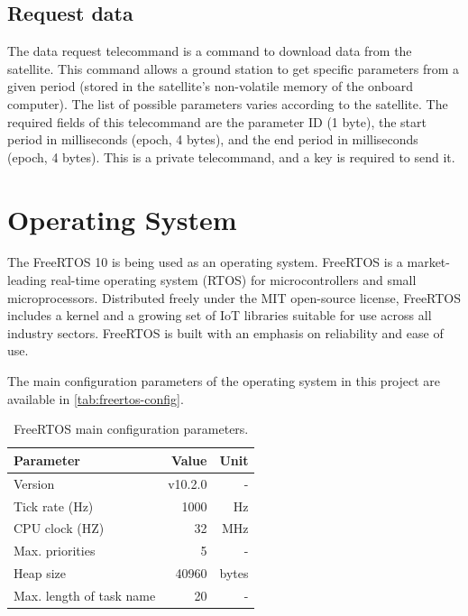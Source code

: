 \subsection{Request data}

The data request telecommand is a command to download data from the satellite. This command allows a ground station to get specific parameters from a given period (stored in the satellite's non-volatile memory of the onboard computer). The list of possible parameters varies according to the satellite. The required fields of this telecommand are the parameter ID (1 byte), the start period in milliseconds (epoch, 4 bytes), and the end period in milliseconds (epoch, 4 bytes). This is a private telecommand, and a key is required to send it.

\section{Operating System}

The FreeRTOS 10 \cite{freertos} is being used as an operating system. FreeRTOS is a market-leading real-time operating system (RTOS) for microcontrollers and small microprocessors. Distributed freely under the MIT open-source license, FreeRTOS includes a kernel and a growing set of IoT libraries suitable for use across all industry sectors. FreeRTOS is built with an emphasis on reliability and ease of use.

The main configuration parameters of the operating system in this project are available in \autoref{tab:freertos-config}.

\begin{table}[!ht]
    \centering
    \begin{tabular}{lrr}
        \toprule[1.5pt]
        \textbf{Parameter}       & \textbf{Value} & \textbf{Unit} \\
        \midrule
        Version                  & v10.2.0        & - \\
        Tick rate (Hz)           & 1000           & Hz \\
        CPU clock (HZ)           & 32             & MHz \\
        Max. priorities          & 5              & - \\
        Heap size                & 40960          & bytes \\
        Max. length of task name & 20             & - \\
        \bottomrule[1.5pt]
    \end{tabular}
    \caption{FreeRTOS main configuration parameters.}
    \label{tab:freertos-config}
\end{table}

